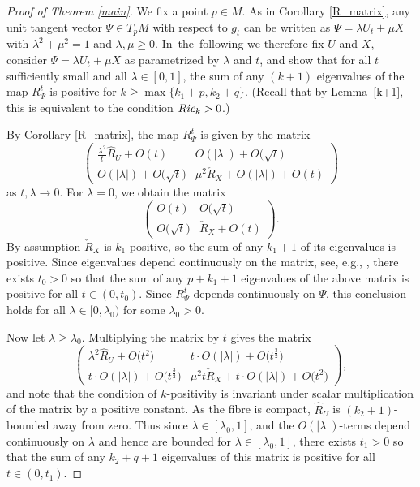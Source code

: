 \documentclass[11pt]{article}
\numberwithin{equation}{section}
\numberwithin{equation}{section}
\begin{document}
\begin{proof}[Proof of Theorem \ref{main}]
	We fix a point $p\in M$. As in Corollary \ref{R_matrix}, any unit tangent vector $\Psi\in T_p M$ with respect to $g_t$ can be written as $\Psi=\lambda U_t+\mu X$ with $\lambda^2+\mu^2=1$ and $\lambda,\mu\geq 0$. In~the~following we therefore fix $U$ and $X$, consider $\Psi=\lambda U_t+\mu X$ as parametrized by $\lambda $ and $t$, and show that for all $t$ sufficiently small and all $\lambda\in[0,1]$, the sum of any $(k+1)$ eigenvalues of the map $R^t_\Psi$ is positive for $k\geq\max\{k_1+p,k_2+q \}$. (Recall that by Lemma~\ref{k+1}, this is equivalent to the condition ${\rm Ric}_k>0$.)
	
	By Corollary \ref{R_matrix}, the map $R_\Psi^t$ is given by the matrix
	\[
	\begin{pmatrix}
		\frac{\lambda^2}{t}\hat{R}_U+O(t) & O(|\lambda|)+O\bigl(\sqrt{t}\bigr)\\
		O(|\lambda|)+O\bigl(\sqrt{t}\bigr) & \mu^2 \check{R}_X+O(|\lambda|)+O(t)
	\end{pmatrix}
	\]
	as $t,\lambda\to0$. For $\lambda=0$, we obtain the matrix
	\[
	\begin{pmatrix}
		O(t) & O\bigl(\sqrt{t}\bigr)\\
		O\bigl(\sqrt{t}\bigr) & \check{R}_X+O(t)
	\end{pmatrix}.
	\]
	By assumption $\check{R}_X$ is $k_1$-positive, so the sum of any $k_1+1$ of its eigenvalues is positive. Since eigenvalues depend continuously on the matrix, see, e.g., \cite[Corollary VI.1.6]{Bh}, there exists $t_0>0$ so that the sum of any $p+k_1+1$ eigenvalues of the above matrix is positive for all $t\in(0,t_0)$. Since $R^t_\Psi$ depends continuously on $\Psi$, this conclusion holds for all $\lambda\in[0,\lambda_0)$ for some $\lambda_0>0$.
	
	Now let $\lambda\geq\lambda_0$. Multiplying the matrix by $t$ gives the matrix
	\[
	\begin{pmatrix}
		\lambda^2 \hat{R}_U+O\bigl(t^2\bigr) & t\cdot O(|\lambda|)+O\bigl(t^{\frac{3}{2} }\bigr)\\
		t\cdot O(|\lambda|)+O\bigl(t^{\frac{3}{2}}\bigr) & \mu^2t \check{R}_X+t\cdot O(|\lambda|)+O\bigl(t^2\bigr)
	\end{pmatrix},
	\]
	and note that the condition of $k$-positivity is invariant under scalar multiplication of the matrix by a positive constant. As the fibre is compact, $\hat{R}_U$ is $(k_2+1)$-bounded away from zero. Thus since $\lambda\in[\lambda_0,1]$, and the $O(|\lambda|)$-terms depend continuously on $\lambda$ and hence are bounded for $\lambda\in[\lambda_0,1]$, there exists $t_1>0$ so that the sum of any $k_2+q+1$ eigenvalues of this matrix is positive for all $t\in(0,t_1)$. %
	

\end{proof}
\end{document}
